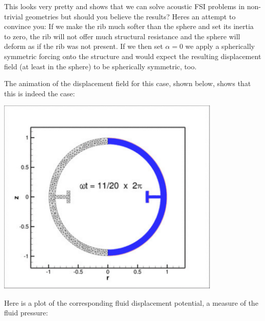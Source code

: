 This looks very pretty and shows that we can solve acoustic F\+SI problems in non-\/trivial geometries but should you believe the results? Here\textquotesingle{}s an attempt to convince you\+: If we make the rib much softer than the sphere and set its inertia to zero, the rib will not offer much structural resistance and the sphere will deform as if the rib was not present. If we then set $ \alpha = 0 $ we apply a spherically symmetric forcing onto the structure and would expect the resulting displacement field (at least in the sphere) to be spherically symmetric, too.

The animation of the displacement field for this case, shown below, shows that this is indeed the case\+:

 
\begin{DoxyImage}
\includegraphics[width=0.8\textwidth]{anim_alpha0}
\end{DoxyImage}


Here is a plot of the corresponding fluid displacement potential, a measure of the fluid pressure\+:

